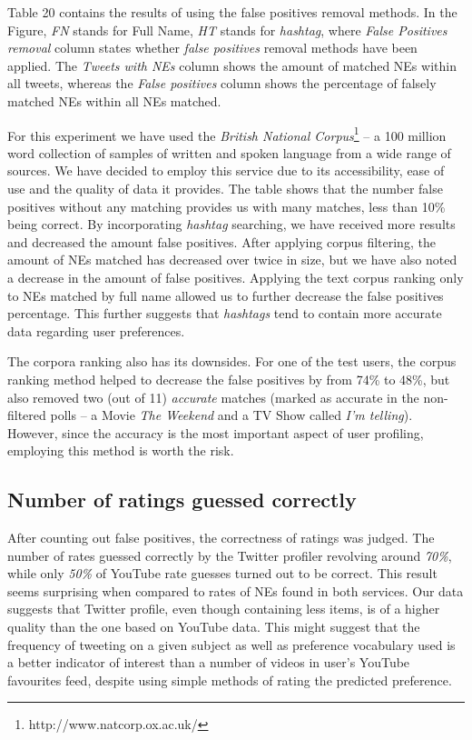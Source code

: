 Table 20 contains the results of using the false positives removal methods. In the Figure,
\textit{FN} stands for Full Name, \textit{HT} stands for \textit{hashtag}, where \textit{False Positives removal}
column states whether \textit{false positives} removal methods have been applied.
The \textit{Tweets with NEs} column shows the amount of matched NEs within all tweets, whereas
the \textit{False positives} column shows the percentage of falsely matched
NEs within all NEs matched.

For this experiment we have used the \textit{British National Corpus}\footnote{http://www.natcorp.ox.ac.uk/} --
a 100 million word collection of samples of written and spoken language from a wide range of sources. We have
decided to employ this service due to its accessibility, ease of use and the quality of data it provides.
The table shows that the number false positives without any matching provides us with many matches, less than
10\% being correct. By incorporating \textit{hashtag} searching, we have received more results and decreased the amount
false positives. After applying corpus filtering, the amount of NEs matched has decreased over twice in size,
but we have also noted a decrease in the amount of false positives. Applying the text corpus ranking only to
NEs matched by full name allowed us to further decrease the false positives percentage.
This further suggests that \textit{hashtags} tend to contain more accurate data regarding user preferences.

The corpora ranking also has its downsides. For one of the test users, the corpus ranking method helped to
decrease the false positives by from 74\% to 48\%, but also removed two (out of 11) \textit{accurate} matches (marked as
accurate in the non-filtered polls -- a Movie \textit{The Weekend} and a TV Show called \textit{I'm telling}).
However, since the accuracy is the most important aspect of user profiling, employing this method is worth
the risk.

\subsection{Number of ratings guessed correctly}
After counting out false positives, the correctness of ratings was judged. The
number of rates guessed correctly by the Twitter profiler revolving around \textit{70\%},
while only \textit{50\%} of YouTube rate guesses turned out to be correct. This
result seems surprising when compared to rates of NEs found in both
services. Our data suggests that Twitter profile, even though containing less
items, is of a higher quality than the one based on YouTube data.  This
might suggest that the frequency of tweeting on a given subject as well as
preference vocabulary used is a better indicator of interest than a number of
videos in user's YouTube favourites feed, despite using simple methods of rating
the predicted preference.
